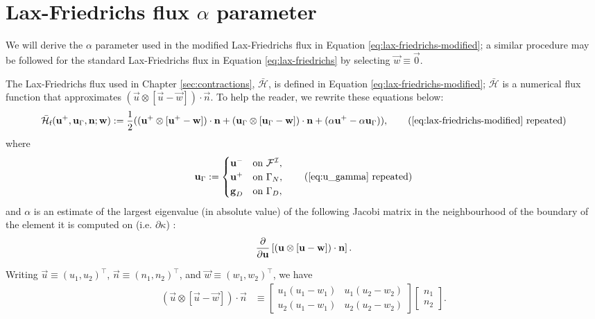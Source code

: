 \chapter{Lax-Friedrichs flux \texorpdfstring{$\alpha$}{α} parameter} \label{sec:lax-friedrichs}
    We will derive the $\alpha$ parameter used in the modified Lax-Friedrichs flux in Equation \eqref{eq:lax-friedrichs-modified}; a similar procedure may be followed for the standard Lax-Friedrichs flux in Equation \eqref{eq:lax-friedrichs} by selecting $\vec{w} \equiv \vec{0}$.
    
    The Lax-Friedrichs flux used in Chapter \ref{sec:contractions}, $\bar{\mathcal{H}}$, is defined in Equation \ref{eq:lax-friedrichs-modified}; $\bar{\mathcal{H}}$ is a numerical flux function that approximates $(\vec{u} \otimes [\vec{u} - \vec{w}]) \cdot \vec{n}$. To help the reader, we rewrite these equations below:
    \begin{equation}
        \bar{\mathcal{H}}_\text{f}(\vec{u}^+, \vec{u}_\Gamma, \vec{n}; \vec{w}) := \frac{1}{2} ((\vec{u}^+ \otimes [\vec{u}^+ - \vec{w}]) \cdot \vec{n} + (\vec{u}_\Gamma \otimes [\vec{u}_\Gamma - \vec{w}]) \cdot \vec{n} + (\alpha \vec{u}^+ - \alpha \vec{u}_\Gamma)),
        \tag{\ref{eq:lax-friedrichs-modified} repeated}
    \end{equation}
    where 
    \begin{equation}
        \vec{u}_\Gamma := 
        \begin{cases}
        \vec{u}^- & \text{on~} \mathcal{F}^\mathcal{I}, \\
            \vec{u}^+ & \text{on~} \Gamma_N, \\
            \vec{g}_D & \text{on~} \Gamma_D, 
        \end{cases}
        \tag{\ref{eq:u_gamma} repeated}
    \end{equation}
    and $\alpha$ is an estimate of the largest eigenvalue (in absolute value) of the following Jacobi matrix in the neighbourhood of the boundary of the element it is computed on (i.e. $\partial \kappa$) \cite{hartmannAdaptiveDiscontinuousGalerkin2003}:
    \begin{equation*}
        \pdv{}{\boldsymbol{\mathbf{u}}}\left[ (\boldsymbol{\mathbf{u}} \otimes [\boldsymbol{\mathbf{u}} - \boldsymbol{\mathbf{w}}]) \cdot \boldsymbol{\mathbf{n}} \right].
    \end{equation*}

    Writing $\vec{u} \equiv (u_1, u_2)^\intercal$, $\vec{n} \equiv (n_1, n_2)^\intercal$, and $\vec{w} \equiv (w_1, w_2)^\intercal$, we have
    \begin{align*}
        (\vec{u} \otimes [\vec{u} - \vec{w}]) \cdot \vec{n} & \equiv
        \begin{bmatrix}
            u_1 (u_1 - w_1) & u_1 (u_2 - w_2) \\
            u_2 (u_1 - w_1) & u_2 (u_2 - w_2)
        \end{bmatrix}
        \begin{bmatrix}
            n_1 \\
            n_2
        \end{bmatrix}.
    \end{align*}

